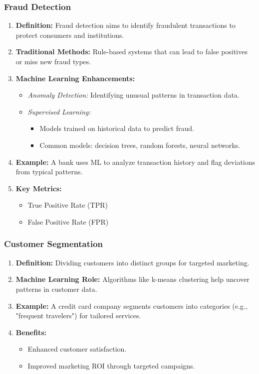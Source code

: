 \documentclass{beamer}
\begin{document}
\begin{frame}[fragile]
    \frametitle{Fraud Detection}
    \begin{enumerate}
        \item \textbf{Definition:} 
            Fraud detection aims to identify fraudulent transactions to protect consumers and institutions.
        \item \textbf{Traditional Methods:} 
            Rule-based systems that can lead to false positives or miss new fraud types.
        
        \item \textbf{Machine Learning Enhancements:}
            \begin{itemize}
                \item \textit{Anomaly Detection:} Identifying unusual patterns in transaction data.
                \item \textit{Supervised Learning:} 
                    \begin{itemize}
                        \item Models trained on historical data to predict fraud.
                        \item Common models: decision trees, random forests, neural networks.
                    \end{itemize}
            \end{itemize}
        \item \textbf{Example:} 
            A bank uses ML to analyze transaction history and flag deviations from typical patterns.
        \item \textbf{Key Metrics:}
            \begin{itemize}
                \item True Positive Rate (TPR)
                \item False Positive Rate (FPR)
            \end{itemize}
    \end{enumerate}
\end{frame}

\begin{frame}[fragile]
    \frametitle{Customer Segmentation}
    \begin{enumerate}
        \item \textbf{Definition:} 
            Dividing customers into distinct groups for targeted marketing.
        \item \textbf{Machine Learning Role:} 
            Algorithms like k-means clustering help uncover patterns in customer data.
        \item \textbf{Example:} 
            A credit card company segments customers into categories (e.g., "frequent travelers") for tailored services.
        \item \textbf{Benefits:}
            \begin{itemize}
                \item Enhanced customer satisfaction.
                \item Improved marketing ROI through targeted campaigns.
            \end{itemize}
    \end{enumerate}
\end{frame}
\end{document}
